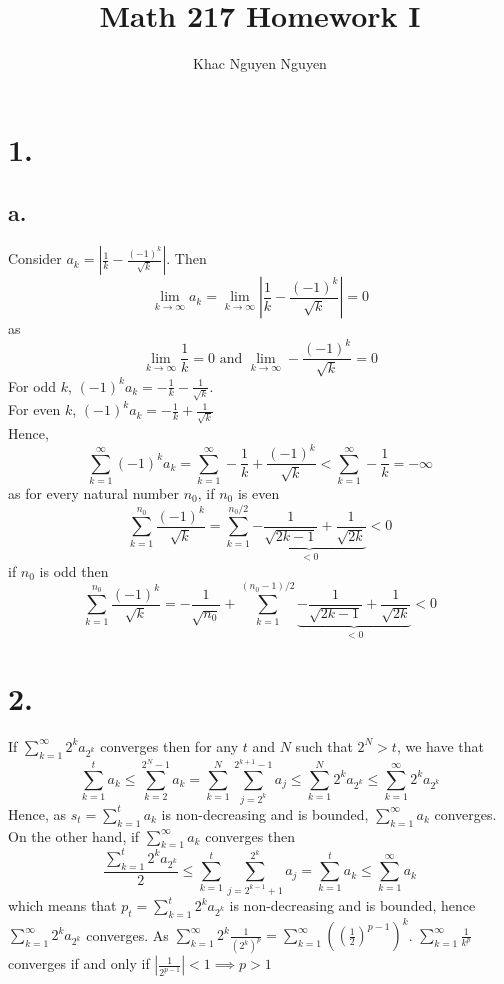 \documentclass[11pt]{article}
\title{\textbf{Math 217 Homework I}}
\author{Khac Nguyen Nguyen}
\date{}
\begin{document}
\section*{1.}
\subsection*{a.}
Consider $a_k = \left|\frac{1}{k} - \frac{(-1)^k}{\sqrt{k}}\right|$. Then
\[
    \lim_{k \to \infty} a_k = \lim_{k \to \infty} \left|\frac{1}{k} - \frac{(-1)^k}{\sqrt{k}}\right| = 0
\]
as 
\[
    \lim_{k \to \infty} \frac{1}{k}= 0 \text{ and } \lim_{k \to \infty} -\frac{(-1)^k}{\sqrt{k}} = 0
\]
For odd $k$, $(-1)^k a_k = -\frac{1}{k} - \frac{1}{\sqrt{k}}$. \\
For even $k$, $(-1)^k a_k = - \frac{1}{k} + \frac{1}{\sqrt{k}}$ \\
Hence, 
\[
    \sum_{k=1}^\infty (-1)^k a_k = \sum_{k=1}^\infty -\frac{1}{k} + \frac{(-1)^k}{\sqrt{k}} < \sum_{k=1}^\infty -\frac{1}{k}  = -\infty
\]
as for every natural number $n_0$, if $n_0$ is even
\[
    \sum_{k=1}^{n_0} \frac{(-1)^k}{\sqrt{k}} = \sum_{k=1}^{n_0/2} \underbrace{-\frac{1}{\sqrt{2k-1}} + \frac{1}{\sqrt{2k}}}_{<0} < 0
\]
if $n_0$ is odd then 
\[
    \sum_{k=1}^{n_0} \frac{(-1)^k}{\sqrt{k}} = -\frac{1}{\sqrt{n_0}} + \sum_{k=1}^{(n_0-1)/2 } \underbrace{-\frac{1}{\sqrt{2k-1}} + \frac{1}{\sqrt{2k}}}_{<0} < 0
\]
\pagebreak
\section*{2.}
If $\sum_{k=1}^\infty 2^k a_{2^k}$ converges then for any $t$ and $N$ such that $2^N > t$, we have that 
\[
    \sum_{k=1}^t a_k \le \sum_{k=2}^{2^N-1} a_k = \sum_{k=1}^N \sum_{j=2^k}^{2^{k+1}-1} a_j \le \sum_{k=1}^N 2^k a_{2^k} \le \sum_{k=1}^\infty 2^k a_{2^k} 
\]
Hence, as $s_t = \sum_{k=1}^t a_k$ is non-decreasing and is bounded, $\sum_{k=1}^\infty a_k$ converges. On the other hand,
if $\sum_{k=1}^\infty a_k$ converges then
\[
    \frac{\sum_{k=1}^t 2^k a_{2^k}}{2} \le \sum_{k=1}^t \sum_{j=2^{k-1}+1}^{2^k} a_j = \sum_{k=1}^t a_k \le \sum_{k=1}^\infty a_k     
\]
which means that $p_t = \sum_{k=1}^t 2^k a_{2^k}$ is non-decreasing and is bounded, hence $\sum_{k=1}^\infty 2^k a_{2^k}$ converges.
As $\sum_{k=1}^\infty 2^k \frac{1}{(2^k)^p} = \sum_{k=1}^\infty \left(\left(\frac{1}{2}\right)^{p-1}\right)^k$. $\sum_{k=1}^\infty \frac{1}{k^p}$
converges if and only if $\left|\frac{1}{2^{p-1}}\right| <1 \implies p>1$
\pagebreak
\end{document}
